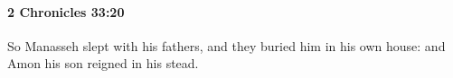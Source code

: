 
		\paragraph{2 Chronicles 33:20} %
			\label{2CHRONICLES-33-20}

			So Manasseh slept with his fathers, and they buried him in his own house: and Amon his son reigned in his stead.


